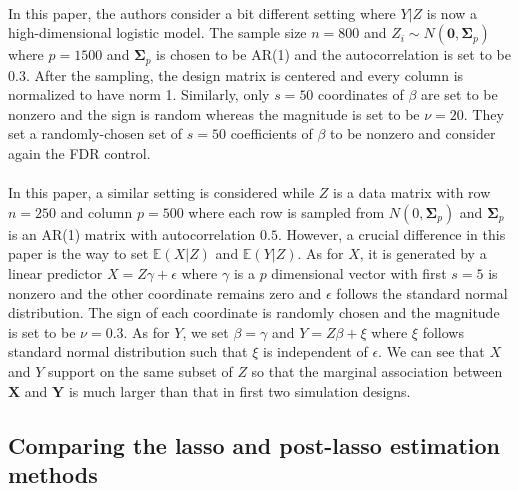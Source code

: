 \documentclass[aos]{imsart}
\theoremstyle{definition}
\theoremstyle{remark}
\newcommand{\E}{\mathbb E}								%
\newcommand{\prx}{\bm X}								%
\newcommand{\pry}{{\bm Y}}								%
\begin{document}
\paragraph*{\citet{CetL16}}
In this paper, the authors consider a bit different setting where $Y|Z$ is now a high-dimensional logistic model. The sample size $n=800$ and $Z_i\sim N(\bm{0},\bm{\Sigma}_{p})$ where $p=1500$ and $\bm{\Sigma}_p$ is chosen to be AR(1) and the autocorrelation is set to be $0.3$. After the sampling, the design matrix is centered and every column is normalized to have norm 1. Similarly, only $s=50$ coordinates of $\beta$ are set to be nonzero and the sign is random whereas the magnitude is set to be $\nu=20$. They set a randomly-chosen set of $s=50$ coefficients of $\beta$ to be nonzero and consider again the FDR control.

\paragraph*{\citet{Li2022}}
In this paper, a similar setting is considered while $Z$ is a data matrix with row $n=250$ and column $p=500$ where each row is sampled from $N(0,\bm{\Sigma}_p)$ and $\bm{\Sigma}_p$ is an AR(1) matrix with autocorrelation $0.5$. However, a crucial difference in this paper is the way to set $\E(X|Z)$ and $\E(Y|Z)$. As for $X$, it is generated by a linear predictor $X=Z\gamma+\epsilon$ where $\gamma$ is a $p$ dimensional vector with first $s=5$ is nonzero and the other coordinate remains zero and $\epsilon$ follows the standard normal distribution. The sign of each coordinate is randomly chosen and the magnitude is set to be $\nu=0.3$. As for $Y$, we set $\beta=\gamma$ and $Y=Z\beta+\xi$ where $\xi$ follows standard normal distribution such that $\xi$ is independent of $\epsilon$. We can see that $X$ and $Y$ support on the same subset of $Z$ so that the marginal association between $\prx$ and $\pry$ is much larger than that in first two simulation designs.

\subsection{Comparing the lasso and post-lasso estimation methods} \label{sec:lasso-vs-plasso}
\end{document}
